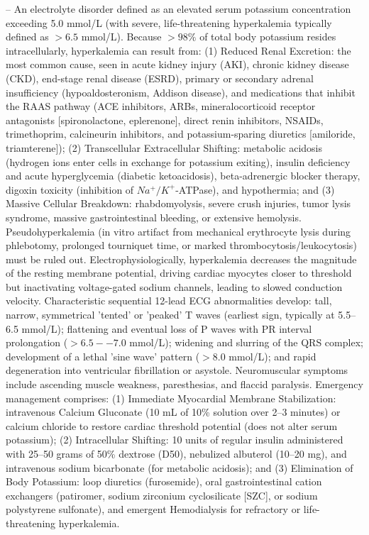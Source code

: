 -- An electrolyte disorder defined as an elevated serum potassium concentration exceeding 5.0 mmol/L (with severe, life-threatening hyperkalemia typically defined as $>6.5$ mmol/L). Because $>98\%$ of total body potassium resides intracellularly, hyperkalemia can result from: (1) Reduced Renal Excretion: the most common cause, seen in acute kidney injury (AKI), chronic kidney disease (CKD), end-stage renal disease (ESRD), primary or secondary adrenal insufficiency (hypoaldosteronism, Addison disease), and medications that inhibit the RAAS pathway (ACE inhibitors, ARBs, mineralocorticoid receptor antagonists [spironolactone, eplerenone], direct renin inhibitors, NSAIDs, trimethoprim, calcineurin inhibitors, and potassium-sparing diuretics [amiloride, triamterene]); (2) Transcellular Extracellular Shifting: metabolic acidosis (hydrogen ions enter cells in exchange for potassium exiting), insulin deficiency and acute hyperglycemia (diabetic ketoacidosis), beta-adrenergic blocker therapy, digoxin toxicity (inhibition of $Na^+/K^+$-ATPase), and hypothermia; and (3) Massive Cellular Breakdown: rhabdomyolysis, severe crush injuries, tumor lysis syndrome, massive gastrointestinal bleeding, or extensive hemolysis. Pseudohyperkalemia (in vitro artifact from mechanical erythrocyte lysis during phlebotomy, prolonged tourniquet time, or marked thrombocytosis/leukocytosis) must be ruled out. Electrophysiologically, hyperkalemia decreases the magnitude of the resting membrane potential, driving cardiac myocytes closer to threshold but inactivating voltage-gated sodium channels, leading to slowed conduction velocity. Characteristic sequential 12-lead ECG abnormalities develop: tall, narrow, symmetrical 'tented' or 'peaked' T waves (earliest sign, typically at 5.5--6.5 mmol/L); flattening and eventual loss of P waves with PR interval prolongation ($>6.5--7.0$ mmol/L); widening and slurring of the QRS complex; development of a lethal 'sine wave' pattern ($>8.0$ mmol/L); and rapid degeneration into ventricular fibrillation or asystole. Neuromuscular symptoms include ascending muscle weakness, paresthesias, and flaccid paralysis. Emergency management comprises: (1) Immediate Myocardial Membrane Stabilization: intravenous Calcium Gluconate (10 mL of 10\% solution over 2--3 minutes) or calcium chloride to restore cardiac threshold potential (does not alter serum potassium); (2) Intracellular Shifting: 10 units of regular insulin administered with 25--50 grams of 50\% dextrose (D50), nebulized albuterol (10--20 mg), and intravenous sodium bicarbonate (for metabolic acidosis); and (3) Elimination of Body Potassium: loop diuretics (furosemide), oral gastrointestinal cation exchangers (patiromer, sodium zirconium cyclosilicate [SZC], or sodium polystyrene sulfonate), and emergent Hemodialysis for refractory or life-threatening hyperkalemia.

